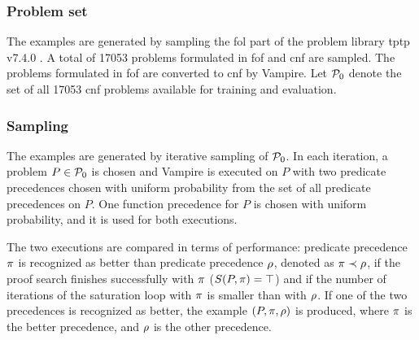 \subsubsection{Problem set}

The examples are generated by sampling the \gls{fol} part of the problem library \gls{tptp} v7.4.0 \cite{10.1007/978-3-030-29436-6_29}.
A total of \num{17053} problems formulated in \gls{fof} and \gls{cnf} are sampled.
The problems formulated in \gls{fof} are converted to \gls{cnf} by Vampire.
Let $\operatorname{\mathcal{P}_{0}}$ denote the set of all \num{17053} \gls{cnf} problems available for training and evaluation.

\subsubsection{Sampling}

The examples are generated by iterative sampling of $\operatorname{\mathcal{P}_{0}}$.
In each iteration, a problem $P \in \operatorname{\mathcal{P}_{0}}$ is chosen and Vampire is executed on $P$
with two predicate precedences chosen with uniform probability from the set of all predicate precedences on $P$.
One function precedence for $P$ is chosen with uniform probability, and it is used for both executions.

The two executions are compared in terms of performance:
predicate precedence $\pi$ is recognized as better than predicate precedence $\rho$,
denoted as $\pi \prec \rho$,
if the proof search finishes successfully with $\pi$ ($S(P, \pi) = \top$)
and if the number of iterations of the saturation loop with $\pi$ is smaller than with $\rho$.
If one of the two precedences is recognized as better,
the example $(P, \pi, \rho)$ is produced,
where $\pi$ is the better precedence,
and $\rho$ is the other precedence.

